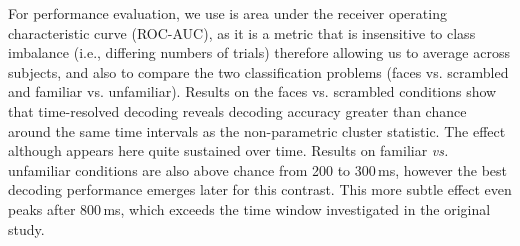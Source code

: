 For performance evaluation, we use is area under the receiver operating characteristic curve (ROC-AUC), as it is a metric that is insensitive to class imbalance (i.e., differing numbers of trials) therefore allowing us to average across subjects, and also to compare the two classification problems (faces vs. scrambled and familiar vs. unfamiliar). Results on the faces vs. scrambled conditions show that time-resolved decoding reveals decoding accuracy greater than chance around the same time intervals as the non-parametric cluster statistic. The effect although appears here quite sustained over time. Results on familiar \emph{vs.} unfamiliar conditions are also above chance from 200 to 300\,ms, however the best decoding performance emerges later for this contrast. This more subtle effect even peaks after 800\,ms, which exceeds the time window investigated in the original study.
